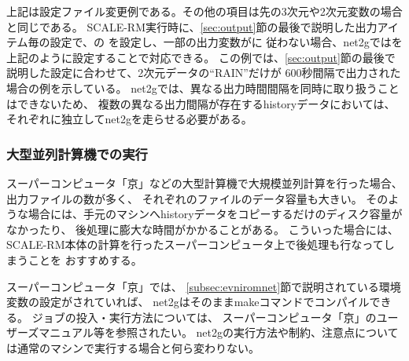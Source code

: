上記は設定ファイル変更例である。その他の項目は先の3次元や2次元変数の場合と同じである。
SCALE-RM実行時に、\ref{sec:output}節の最後で説明した出力アイテム毎の設定で、の
を設定し、一部の出力変数がに
従わない場合、net2gではを上記のように設定することで対応できる。
この例では、\ref{sec:output}節の最後で説明した設定に合わせて、2次元データの``RAIN''だけが
600秒間隔で出力された場合の例を示している。
net2gでは、異なる出力時間間隔を同時に取り扱うことはできないため、
複数の異なる出力間隔が存在するhistoryデータにおいては、
それぞれに独立してnet2gを走らせる必要がある。

\subsubsection{大型並列計算機での実行}
スーパーコンピュータ「京」などの大型計算機で大規模並列計算を行った場合、出力ファイルの数が多く、
それぞれのファイルのデータ容量も大きい。
そのような場合には、手元のマシンへhistoryデータをコピーするだけのディスク容量がなかったり、
後処理に膨大な時間がかかることがある。
こういった場合には、
SCALE-RM本体の計算を行ったスーパーコンピュータ上で後処理も行なってしまうことを
おすすめする。

スーパーコンピュータ「京」では、
\ref{subsec:evniromnet}節で説明されている環境変数の設定がされていれば、
net2gはそのままmakeコマンドでコンパイルできる。
ジョブの投入・実行方法については、
スーパーコンピュータ「京」のユーザーズマニュアル等を参照されたい。
net2gの実行方法や制約、注意点については通常のマシンで実行する場合と何ら変わりない。



